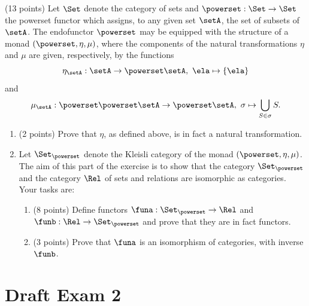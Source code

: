 \documentclass[paper=8.125in:10.250in,pagesize=pdftex,
    headinclude=false,footinclude=false,oneside,egregdoesnotlikesansseriftitles]{kaobook}
\begin{document}
\begin{gradedexercise}\label{ex:RelKleisli}
(13 points) Let $\Set$ denote the category of sets and $\powerset : \Set \to \Set$ the powerset functor which assigns, to any given set $\setA$, the set of subsets of $\setA$. The endofunctor $\powerset$ may be equipped with the structure of a monad $(\powerset, \eta, \mu)$, where the components of the natural transformations $\eta$ and $\mu$ are given, respectively, by the functions
$$ \eta_{\setA} : \setA \to \powerset \setA, \ \ela \mapsto \{ \ela \}$$
and
$$ \mu_{\setA} : \powerset \powerset \setA \to \powerset \setA, \ \sigma \mapsto \bigcup_{S \in \sigma} S.$$

\begin{enumerate}
\item (2 points) Prove that $\eta$, as defined above, is in fact a natural transformation. 
\item Let $\Set_{\powerset}$ denote the Kleisli category of the monad $(\powerset, \eta, \mu)$. The aim of this part of the exercise is to show that the category $\Set_{\powerset}$ and the category $\Rel$ of sets and relations are isomorphic as categories. Your tasks are:
\begin{enumerate}
\item (8 points) Define functors $\funa: \Set_{\powerset} \to \Rel$ and $\funb: \Rel \to \Set_{\powerset}$ and prove that they are in fact functors. 
\item (3 points) Prove that $\funa$ is an isomorphism of categories, with inverse $\funb$. 
\end{enumerate}
\end{enumerate}
\end{gradedexercise}


\newpage



\section*{Draft Exam 2}
\end{document}
